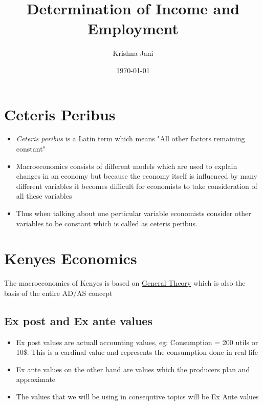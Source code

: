 \documentclass[11pt]{article}
\author{Krishna Jani}
\date{\today}
\title{Determination of Income and Employment}
\begin{document}
\maketitle
\tableofcontents


\section{Ceteris Peribus}
\label{sec:org86a2d64}
\begin{itemize}
\item \emph{Ceteris peribus} is a Latin term which means "All other factors remaining constant"
\item Macroeconomics consists of different models which are used to explain changes in an economy but because the economy itself is influenced by many different variables it becomes difficult for economists to take consideration of all these variables
\item Thus when talking about one perticular variable economists consider other variables to be constant which is called as ceteris peribus.
\end{itemize}

\section{Kenyes Economics}
\label{sec:org873fc21}
The macroeconomics of Kenyes is based on  \href{General Theory Kenyes.org}{General Theory} which is also the basis of the entire AD/AS concept

\subsection{Ex post and Ex ante values}
\label{sec:org80c4591}
\begin{itemize}
\item Ex post values are actuall accounting values, eg: Consumption = 200 utils or 10\$. This is a cardinal value and represents the consumption done in real life
\item Ex ante values on the other hand are values which the producers plan and  approximate
\item The values that we will be using in consequtive topics will be Ex Ante values
\end{itemize}
\end{document}
